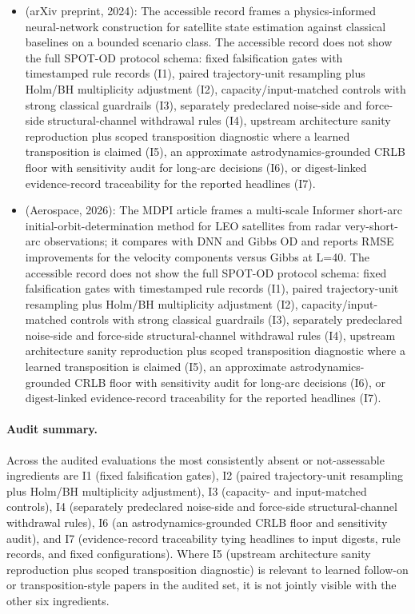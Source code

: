\begin{itemize}[leftmargin=*]
  \item \cite{varey2024physics} (arXiv preprint, 2024): The accessible record frames a physics-informed neural-network construction for satellite state estimation against classical baselines on a bounded scenario class. The accessible record does not show the full SPOT-OD protocol schema: fixed falsification gates with timestamped rule records (I1), paired trajectory-unit resampling plus Holm/BH multiplicity adjustment (I2), capacity/input-matched controls with strong classical guardrails (I3), separately predeclared noise-side and force-side structural-channel withdrawal rules (I4), upstream architecture sanity reproduction plus scoped transposition diagnostic where a learned transposition is claimed (I5), an approximate astrodynamics-grounded CRLB floor with sensitivity audit for long-arc decisions (I6), or digest-linked evidence-record traceability for the reported headlines (I7).
  \item \cite{zhu2026multiscale} (Aerospace, 2026): The MDPI article frames a multi-scale Informer short-arc initial-orbit-determination method for LEO satellites from radar very-short-arc observations; it compares with DNN and Gibbs OD and reports RMSE improvements for the velocity components versus Gibbs at L=40. The accessible record does not show the full SPOT-OD protocol schema: fixed falsification gates with timestamped rule records (I1), paired trajectory-unit resampling plus Holm/BH multiplicity adjustment (I2), capacity/input-matched controls with strong classical guardrails (I3), separately predeclared noise-side and force-side structural-channel withdrawal rules (I4), upstream architecture sanity reproduction plus scoped transposition diagnostic where a learned transposition is claimed (I5), an approximate astrodynamics-grounded CRLB floor with sensitivity audit for long-arc decisions (I6), or digest-linked evidence-record traceability for the reported headlines (I7).
\end{itemize}

\paragraph{Audit summary.}
Across the audited evaluations the most consistently absent or not-assessable ingredients are I1 (fixed falsification gates), I2 (paired trajectory-unit resampling plus Holm/BH multiplicity adjustment), I3 (capacity- and input-matched controls), I4 (separately predeclared noise-side and force-side structural-channel withdrawal rules), I6 (an astrodynamics-grounded CRLB floor and sensitivity audit), and I7 (evidence-record traceability tying headlines to input digests, rule records, and fixed configurations). Where I5 (upstream architecture sanity reproduction plus scoped transposition diagnostic) is relevant to learned follow-on or transposition-style papers in the audited set, it is not jointly visible with the other six ingredients.